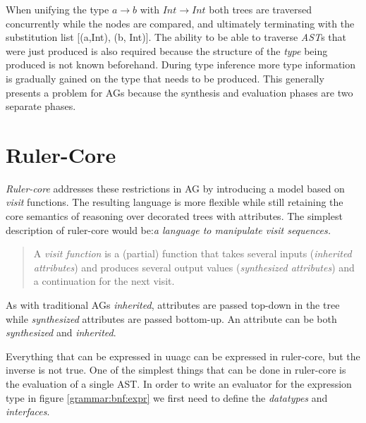 \documentclass[twoside, titlepage, openright, a4paper]{book}
\newcommand{\Rcore}{\emph{Ruler-core }}
\begin{document}
When unifying the type \emph{$a \rightarrow b$} with \emph{$Int \rightarrow Int$} both trees are traversed concurrently while the nodes are compared, and ultimately terminating with the substitution list [(a,Int), (b, Int)]. The ability to be able to traverse \emph{AST}s that were just produced is also required because the structure of the \emph{type} being produced is not known beforehand. During type inference more type information is gradually gained on the type that needs to be produced. This generally presents a problem for AGs\cite{ruler-front} because the synthesis and evaluation phases are two separate phases.

\section{Ruler-Core}
\Rcore addresses these restrictions in AG by introducing a model based on \emph{visit}\cite{visits} functions. The resulting language is more flexible while still retaining the core semantics of reasoning over decorated trees with attributes. The simplest description of ruler-core would be:\emph{a language to manipulate visit sequences.}

\begin{quotation}
A \emph{visit function}\cite{visitag} is a (partial) function that takes several inputs (\emph{inherited attributes}) and produces several output values (\emph{synthesized attributes}) and a continuation for the next visit.
\end{quotation}

As with traditional AGs \emph{inherited}, attributes are passed top-down in the tree while \emph{synthesized} attributes are passed bottom-up. An attribute can be both \emph{synthesized} and \emph{inherited}.

Everything that can be expressed in uuagc can be expressed in ruler-core, but the inverse is not true. One of the simplest things that can be done in ruler-core is the evaluation of a single AST. In order to write an evaluator for the expression type in figure \ref{grammar:bnf:expr} we first need to define the \emph{datatypes} and \emph{interfaces}.
\end{document}
